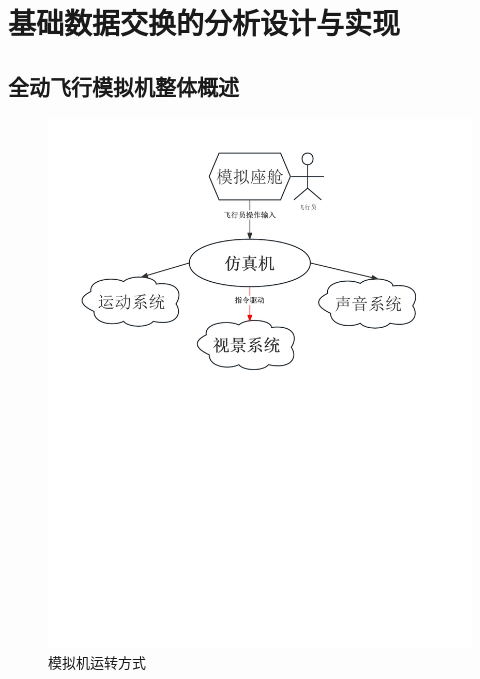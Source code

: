\chapter{基础数据交换的分析设计与实现}
\section{全动飞行模拟机整体概述}

\begin{figure}[h]
    \begin{center}
        \includegraphics[width=\textwidth]{pictures/simstruct.pdf}
        \caption{模拟机运转方式}
        \label{framework}
    \end{center}
\end{figure}
